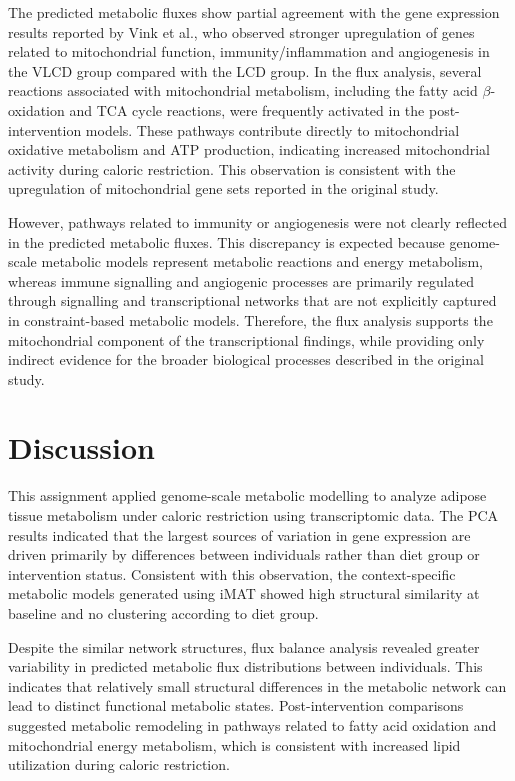 \documentclass[11pt, a4paper]{article}
\begin{document}
The predicted metabolic fluxes show partial agreement with the gene expression results reported by Vink et al., who observed stronger upregulation of genes related to mitochondrial function, immunity/inflammation and angiogenesis in the VLCD group compared with the LCD group. In the flux analysis, several reactions associated with mitochondrial metabolism, including the fatty acid $\beta$-oxidation and TCA cycle reactions, were frequently activated in the post-intervention models. These pathways contribute directly to mitochondrial oxidative metabolism and ATP production, indicating increased mitochondrial activity during caloric restriction. This observation is consistent with the upregulation of mitochondrial gene sets reported in the original study.

However, pathways related to immunity or angiogenesis were not clearly reflected in the predicted metabolic fluxes. This discrepancy is expected because genome-scale metabolic models represent metabolic reactions and energy metabolism, whereas immune signalling and angiogenic processes are primarily regulated through signalling and transcriptional networks that are not explicitly captured in constraint-based metabolic models. Therefore, the flux analysis supports the mitochondrial component of the transcriptional findings, while providing only indirect evidence for the broader biological processes described in the original study.

\section{Discussion}
\label{sec:discussion}

This assignment applied genome-scale metabolic modelling to analyze adipose tissue metabolism under caloric restriction using transcriptomic data. The PCA results indicated that the largest sources of variation in gene expression are driven primarily by differences between individuals rather than diet group or intervention status. Consistent with this observation, the context-specific metabolic models generated using iMAT showed high structural similarity at baseline and no clustering according to diet group.

Despite the similar network structures, flux balance analysis revealed greater variability in predicted metabolic flux distributions between individuals. This indicates that relatively small structural differences in the metabolic network can lead to distinct functional metabolic states. Post-intervention comparisons suggested metabolic remodeling in pathways related to fatty acid oxidation and mitochondrial energy metabolism, which is consistent with increased lipid utilization during caloric restriction.
\end{document}
